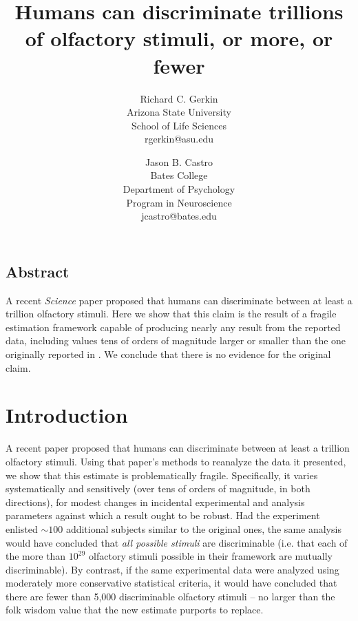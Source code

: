 \documentclass[letterpaper,twocolumn,10pt]{article}
\begin{document}
\setcounter{table}{0}
\setcounter{section}{0}

\date{}

\title{\Large \bf Humans can discriminate trillions of olfactory stimuli, or more, or fewer}

\author{
{\rm Richard C. Gerkin}\\
Arizona State University\\
School of Life Sciences\\
rgerkin@asu.edu
\and
{\rm Jason B. Castro}\\
Bates College\\
Department of Psychology\\
Program in Neuroscience \\
jcastro@bates.edu
}

\maketitle

\thispagestyle{empty}


\subsection*{Abstract}
A recent \textit{Science} paper \cite{bushdid_humans_2014} proposed that humans can discriminate between at least a trillion olfactory stimuli. 
Here we show that this claim is the result of a fragile estimation framework capable of producing nearly any result from the reported data, 
including values tens of orders of magnitude larger or smaller than the one originally reported in \cite{bushdid_humans_2014}. 
We conclude that there is no evidence for the original claim.  

\section{Introduction}
\label{sec:intro}
A recent paper \cite{bushdid_humans_2014} proposed that humans can discriminate between at least a trillion olfactory stimuli. 
Using that paper's methods to reanalyze the data it presented, 
we show that this estimate is problematically fragile. 
Specifically, it varies systematically and sensitively 
(over tens of orders of magnitude, in both directions), 
for modest changes in incidental experimental and analysis parameters against which a result ought to be robust.  
Had the experiment enlisted $\sim100$ additional subjects similar to the original ones, 
the same analysis would have concluded that \textit{all possible stimuli} are discriminable 
(i.e. that each of the more than $10^{29}$ olfactory stimuli possible in their framework are mutually discriminable). 
By contrast, if the same experimental data were analyzed using moderately more conservative statistical criteria, 
it would have concluded that there are fewer than 5,000 discriminable olfactory stimuli -- 
no larger than the folk wisdom value that the new estimate purports to replace. 
\end{document}
